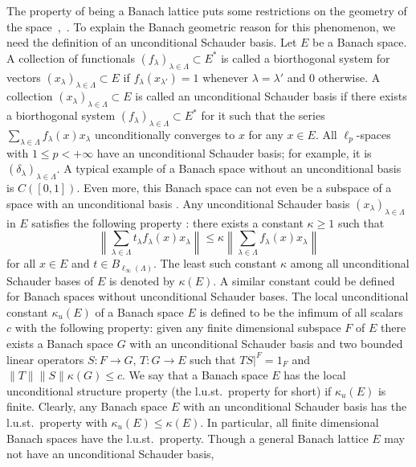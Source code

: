 The property of being a Banach lattice puts some restrictions on the geometry of
the space~\cite{SherOrderInOpAlg},~\cite{KadOrderPropOfBoundSAOps}. To explain
the Banach geometric reason for this phenomenon, we need the definition of an
unconditional Schauder basis. Let $E$ be a Banach space. A collection of
functionals ${(f_\lambda)}_{\lambda\in\Lambda}\subset E^*$ is called 
a biorthogonal system for vectors ${(x_\lambda)}_{\lambda\in\Lambda}\subset E$ 
if $f_\lambda(x_{\lambda'})=1$ whenever $\lambda=\lambda'$ 
and $0$ otherwise. A collection ${(x_\lambda)}_{\lambda\in\Lambda}\subset E$ 
is called an unconditional Schauder basis if there exists 
a biorthogonal system ${(f_\lambda)}_{\lambda\in\Lambda}\subset E^*$ 
for it such that the series $\sum_{\lambda\in\Lambda} f_\lambda(x)x_\lambda$ 
unconditionally converges to $x$ for any $x\in E$. All $\ell_p$-spaces 
with $1\leq p<+\infty$ have an unconditional Schauder basis; for example, it is
${(\delta_\lambda)}_{\lambda\in\Lambda}$. A typical example of a Banach space without
an unconditional basis is $C([0,1])$. Even more, this Banach space can not even be a
subspace of a space with an unconditional basis \cite[proposition 3.5.4]{KalAlbTopicsBanSpTh}.  Any unconditional Schauder basis
${(x_\lambda)}_{\lambda\in\Lambda}$ in $E$ satisfies the following property
\cite[proposition 1.6]{DiestAbsSumOps}: there exists a constant $\kappa\geq 1$
such that
\[
\left\lVert \sum_{\lambda\in\Lambda}t_\lambda f_\lambda(x)x_\lambda\right\rVert
\leq
\kappa\left\lVert \sum_{\lambda\in\Lambda}f_\lambda(x)x_\lambda\right\rVert
\]
for all $x\in E$ and $t\in B_{\ell_\infty(\Lambda)}$. The least such constant
$\kappa$ among all unconditional Schauder bases of $E$ is denoted by
$\kappa(E)$. A similar constant could be defined for Banach spaces without
unconditional Schauder bases. The local unconditional constant $\kappa_u(E)$ of
a Banach space $E$ is defined to be the infimum of all scalars $c$ with the
following property: given any finite dimensional subspace $F$ of $E$ there
exists a Banach space $G$ with an unconditional Schauder basis and two bounded
linear operators $S:F\to G$, $T:G\to E$ such that $TS|^{F}=1_F$ and $\lVert
T\rVert\lVert S\rVert\kappa(G)\leq c$. We say that a Banach space $E$ has the local
unconditional structure property (the l.u.st.\ property for short) if
$\kappa_u(E)$ is finite. Clearly, any Banach space $E$ with an unconditional
Schauder basis has the l.u.st.\ property with $\kappa_u(E)\leq\kappa(E)$. In
particular, all finite dimensional Banach spaces have the l.u.st.\ property.
Though a general Banach lattice $E$ may not have an unconditional Schauder basis,
